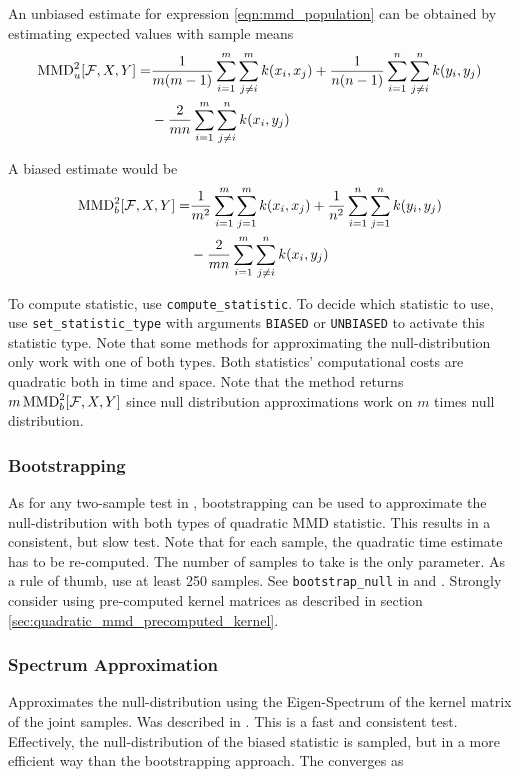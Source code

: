 An unbiased estimate for expression \ref{eqn:mmd_population} can be obtained by estimating expected values with sample means
\begin{align*}
\operatorname{MMD}_u^2[\mathcal{F},X,Y]=&\frac{1}{m(m-1)}\sum_{i=1}^m\sum_{j\neq i}^mk(x_i,x_j) + \frac{1}{n(n-1)}\sum_{i=1}^n\sum_{j\neq i}^nk(y_i,y_j)\\
&-\frac{2}{mn}\sum_{i=1}^m\sum_{j\neq i}^nk(x_i,y_j)
\end{align*}

A biased estimate would be
\begin{align*}
\operatorname{MMD}_b^2[\mathcal{F},X,Y]=&\frac{1}{m^2}\sum_{i=1}^m\sum_{j=1}^mk(x_i,x_j) + \frac{1}{n^ 2}\sum_{i=1}^n\sum_{j=1}^nk(y_i,y_j)\\
&-\frac{2}{mn}\sum_{i=1}^m\sum_{j\neq i}^nk(x_i,y_j)
\end{align*}

To compute statistic, use \texttt{compute\_statistic}. To decide which statistic to use, use \texttt{set\_statistic\_type} with arguments \texttt{BIASED} or \texttt{UNBIASED} to activate this statistic type. Note that some methods for approximating the null-distribution only work with one of both types. Both statistics' computational costs are quadratic both in time and space. Note that the method returns $m\operatorname{MMD}_b^2[\mathcal{F},X,Y]$ since null distribution approximations work on $m$ times null distribution.

\subsubsection{Bootstrapping}
As for any two-sample test in \shogun{}, bootstrapping can be used to approximate the null-distribution with both types of quadratic MMD statistic. This results in a consistent, but slow test. Note that for each sample, the quadratic time estimate has to be re-computed. The number of samples to take is the only parameter. As a rule of thumb, use at least 250 samples.
See \texttt{bootstrap\_null} in  and . Strongly consider using pre-computed kernel matrices as described in section \ref{sec:quadratic_mmd_precomputed_kernel}.

\subsubsection{Spectrum Approximation}
Approximates the null-distribution using the Eigen-Spectrum of the kernel matrix of the joint samples. Was described in \citep{Gretton2012b}. This is a fast and consistent test. Effectively, the null-distribution of the biased statistic is sampled, but in a more efficient way than the bootstrapping approach. The converges as

